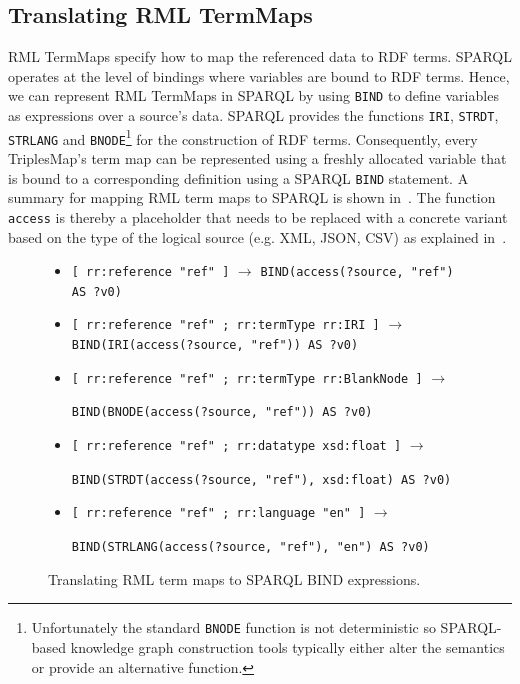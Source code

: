 \subsection{Translating RML TermMaps}
RML TermMaps specify how to map the referenced data to RDF terms.
SPARQL operates at the level of bindings where variables are bound to RDF terms.
Hence, we can represent RML TermMaps in SPARQL by using \texttt{BIND} to define variables as expressions over a source's data.
SPARQL provides the functions \texttt{IRI}, \texttt{STRDT}, \texttt{STRLANG} and \texttt{BNODE}\footnote{Unfortunately the standard \texttt{BNODE} function is not deterministic so SPARQL-based knowledge graph construction tools typically either alter the semantics or provide an alternative function.} for the construction of RDF terms.
Consequently, every TriplesMap's term map can be represented using a freshly allocated variable that is bound to a corresponding definition using a SPARQL \texttt{BIND} statement. A summary for mapping RML term maps to SPARQL is shown in~. The function \texttt{access} is thereby a placeholder that needs to be replaced with a concrete variant based on the type of the logical source (e.g. XML, JSON, CSV) as explained in~.

\begin{figure}
\begin{footnotesize}
\begin{itemize}
  \item \lstinline{[ rr:reference "ref" ]} $\rightarrow$ \lstinline{BIND(access(?source, "ref") AS ?v0)}
  \item \lstinline{[ rr:reference "ref" ; rr:termType rr:IRI ]} $\rightarrow$ \lstinline{BIND(IRI(access(?source, "ref")) AS ?v0)}
  \item \lstinline{[ rr:reference "ref" ; rr:termType rr:BlankNode ]} $\rightarrow$
  
  \hspace{1cm}\lstinline{BIND(BNODE(access(?source, "ref")) AS ?v0)}
  \item \lstinline{[ rr:reference "ref" ; rr:datatype xsd:float ]} $\rightarrow$
  
  \hspace{1cm}\lstinline{BIND(STRDT(access(?source, "ref"), xsd:float) AS ?v0)}
  \item \lstinline{[ rr:reference "ref" ; rr:language "en" ]} $\rightarrow$
    
  \hspace{1cm}\lstinline{BIND(STRLANG(access(?source, "ref"), "en") AS ?v0)}
\end{itemize}
\end{footnotesize}
 \vspace*{-5mm}
\caption{Translating RML term maps to SPARQL BIND expressions.}
\label{fig:tm-to-sparql}
\end{figure}

